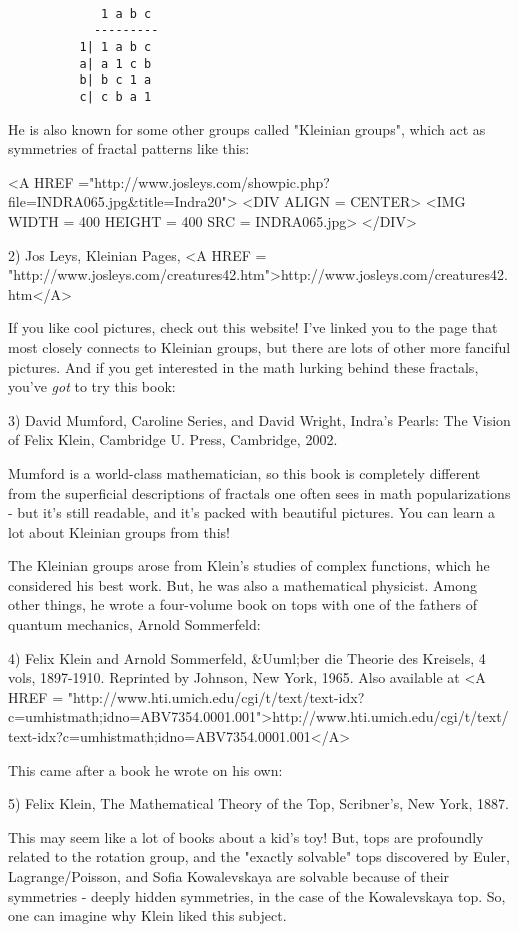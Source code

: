 \begin{verbatim}

             1 a b c
            ---------
          1| 1 a b c
          a| a 1 c b
          b| b c 1 a
          c| c b a 1
\end{verbatim}
    
He is also known for some other groups called "Kleinian groups", which
act as symmetries of fractal patterns like this:

<A HREF ="http://www.josleys.com/showpic.php?file=INDRA065.jpg&title=Indra20">
<DIV ALIGN = CENTER>
<IMG WIDTH = 400 HEIGHT = 400 SRC = INDRA065.jpg>
</DIV>

2) Jos Leys, Kleinian Pages, <A HREF = "http://www.josleys.com/creatures42.htm">http://www.josleys.com/creatures42.htm</A>

If you like cool pictures, check out this website!  I've linked you to 
the page that most closely connects to Kleinian groups, but there are 
lots of other more fanciful pictures.   And if you get interested in 
the math lurking behind these fractals, you've \emph{got} to try this book:

3) David Mumford, Caroline Series, and David Wright, Indra's Pearls: 
The Vision of Felix Klein, Cambridge U. Press, Cambridge, 2002.

Mumford is a world-class mathematician, so this book is completely
different from the superficial descriptions of fractals one often sees
in math popularizations - but it's still readable, and it's packed with 
beautiful pictures.  You can learn a lot about Kleinian groups from this!

The Kleinian groups arose from Klein's studies of complex functions,
which he considered his best work.  But, he was also a mathematical 
physicist.  Among other things, he wrote a four-volume book on tops 
with one of the fathers of quantum mechanics, Arnold Sommerfeld:

4) Felix Klein and Arnold Sommerfeld, &Uuml;ber die Theorie des Kreisels,
4 vols, 1897-1910.  Reprinted by Johnson, New York, 1965.  Also available
at <A HREF = "http://www.hti.umich.edu/cgi/t/text/text-idx?c=umhistmath;idno=ABV7354.0001.001">http://www.hti.umich.edu/cgi/t/text/text-idx?c=umhistmath;idno=ABV7354.0001.001</A>

This came after a book he wrote on his own:

5) Felix Klein, The Mathematical Theory of the Top, Scribner's, 
New York, 1887.

This may seem like a lot of books about a kid's toy!  But, tops 
are profoundly related to the rotation group, and the "exactly 
solvable" tops discovered by Euler, Lagrange/Poisson, and 
Sofia Kowalevskaya are solvable because of their symmetries - 
deeply hidden symmetries, in the case of the Kowalevskaya top.  
So, one can imagine why Klein liked this subject.

